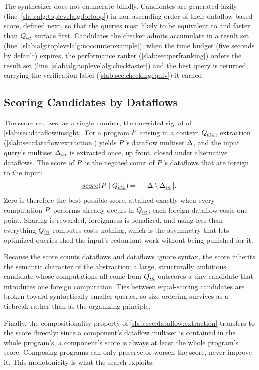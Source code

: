 The synthesizer does not enumerate blindly. Candidates are generated
lazily (line~\ref{slab:alg:toplevelalg:forloop}) in non-ascending
order of their dataflow-based score, defined next, so that the queries
most likely to be equivalent to and faster than $Q_{\emph{in}}$ surface
first. Candidates the checker admits accumulate in a result set
(line~\ref{slab:alg:toplevelalg:nocounterexample}); when the time
budget (five seconds by default) expires, the performance ranker
(\cref{slab:sec:perfranking}) orders the result set
(line~\ref{slab:alg:toplevelalg:checkfaster}) and the best query is
returned, carrying the verification label
(\cref{slab:sec:checkingequiv}) it earned.

\subsection{Scoring Candidates by Dataflows}
\label{slab:sec:scorefunction}

The score realizes, as a single number, the one-sided signal of
\cref{slab:sec:dataflow:insight}. For a program $P$ arising in
a context $Q_{\emph{ctx}}$, extraction
(\cref{slab:sec:dataflow:extraction}) yields $P$'s dataflow
multiset $\Delta$, and the input query's multiset
$\Delta_{\emph{in}}$ is extracted once, up front, closed under
alternative dataflows. The score of $P$ is the negated count of
$P$'s dataflows that are foreign to the input:
\[
\emph{score}(P \mid Q_{\emph{ctx}})
= - \, \big| \, \Delta \setminus \Delta_{\emph{in}} \, \big|.
\]
Zero is therefore the best possible score, attained exactly when every
computation $P$ performs already occurs in $Q_{\emph{in}}$; each
foreign dataflow costs one point. Sharing is rewarded, foreignness is
penalized, and using less than everything $Q_{\emph{in}}$ computes costs
nothing, which is the asymmetry that lets optimized queries shed the
input's redundant work without being punished for it.

Because the score counts dataflows and dataflows ignore syntax, the
score inherits the semantic character of the abstraction: a large,
structurally ambitious candidate whose computations all come from
$Q_{\emph{in}}$ outscores a tiny candidate that introduces one foreign
computation. Ties between equal-scoring candidates are broken toward
syntactically smaller queries, so size ordering survives as a tiebreak
rather than as the organizing principle.

Finally, the compositionality property of
\cref{slab:sec:dataflow:extraction} transfers to the score directly:
since a component's dataflow multiset is contained in the whole
program's, a component's score is always at least the whole program's
score. Composing programs can only preserve or worsen the score, never
improve it. This monotonicity is what the search exploits.


